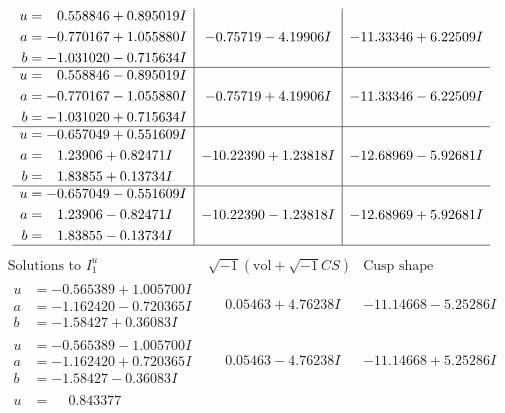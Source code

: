 \documentclass[1p]{elsarticle_modified}
\theoremstyle{definition}
\newcommand{\I}{\sqrt{-1}}
\begin{document}
$$\begin{array}{c|c|c}
\begin{aligned}
u &= \phantom{-}0.558846 + 0.895019 I \\
a &= -0.770167 + 1.055880 I \\
b &= -1.031020 - 0.715634 I\end{aligned}
 & -0.75719 - 4.19906 I & -11.33346 + 6.22509 I \\ \hline\begin{aligned}
u &= \phantom{-}0.558846 - 0.895019 I \\
a &= -0.770167 - 1.055880 I \\
b &= -1.031020 + 0.715634 I\end{aligned}
 & -0.75719 + 4.19906 I & -11.33346 - 6.22509 I \\ \hline\begin{aligned}
u &= -0.657049 + 0.551609 I \\
a &= \phantom{-}1.23906 + 0.82471 I \\
b &= \phantom{-}1.83855 + 0.13734 I\end{aligned}
 & -10.22390 + 1.23818 I & -12.68969 - 5.92681 I \\ \hline\begin{aligned}
u &= -0.657049 - 0.551609 I \\
a &= \phantom{-}1.23906 - 0.82471 I \\
b &= \phantom{-}1.83855 - 0.13734 I\end{aligned}
 & -10.22390 - 1.23818 I & -12.68969 + 5.92681 I\\
 \hline 
 \end{array}$$\newpage$$\begin{array}{c|c|c}  
\text{Solutions to }I^u_{1}& \I (\text{vol} + \sqrt{-1}CS) & \text{Cusp shape}\\
 \hline 
\begin{aligned}
u &= -0.565389 + 1.005700 I \\
a &= -1.162420 - 0.720365 I \\
b &= -1.58427 + 0.36083 I\end{aligned}
 & \phantom{-}0.05463 + 4.76238 I & -11.14668 - 5.25286 I \\ \hline\begin{aligned}
u &= -0.565389 - 1.005700 I \\
a &= -1.162420 + 0.720365 I \\
b &= -1.58427 - 0.36083 I\end{aligned}
 & \phantom{-}0.05463 - 4.76238 I & -11.14668 + 5.25286 I \\ \hline\begin{aligned}
u &= \phantom{-}0.843377\phantom{ +0.000000I} \\

\end{aligned}
\end{array}$$
\end{document}
